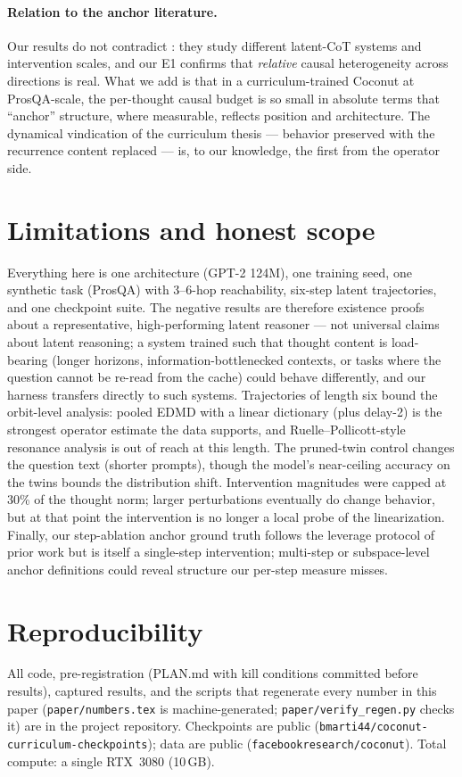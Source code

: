 \documentclass[11pt]{article}
\newcommand{\prosqa}{ProsQA}
\begin{document}
\paragraph{Relation to the anchor literature.} Our results do not contradict
\citet{li2026dynamics}: they study different latent-CoT systems and intervention
scales, and our E1 confirms that \emph{relative} causal heterogeneity across
directions is real. What we add is that in a curriculum-trained Coconut at
ProsQA-scale, the per-thought causal budget is so small in absolute terms that
``anchor'' structure, where measurable, reflects position and architecture. The
dynamical vindication of the curriculum thesis \citep{martin2026curriculum} ---
behavior preserved with the recurrence content replaced --- is, to our knowledge,
the first from the operator side.

\section{Limitations and honest scope}
\label{sec:limits}

Everything here is one architecture (GPT-2 124M), one training seed, one synthetic
task (\prosqa) with 3--6-hop reachability, six-step latent trajectories, and one
checkpoint suite. The negative results are therefore existence proofs about a
representative, high-performing latent reasoner --- not universal claims about
latent reasoning; a system trained such that thought content is load-bearing
(longer horizons, information-bottlenecked contexts, or tasks where the question
cannot be re-read from the cache) could behave differently, and our harness
transfers directly to such systems. Trajectories of length six bound the
orbit-level analysis: pooled EDMD with a linear dictionary (plus delay-2) is the
strongest operator estimate the data supports, and Ruelle--Pollicott-style
resonance analysis is out of reach at this length. The pruned-twin control changes
the question text (shorter prompts), though the model's near-ceiling accuracy on
the twins bounds the distribution shift. Intervention magnitudes were capped at
30\% of the thought norm; larger perturbations eventually do change behavior, but
at that point the intervention is no longer a local probe of the linearization.
Finally, our step-ablation anchor ground truth follows the leverage protocol of
prior work but is itself a single-step intervention; multi-step or subspace-level
anchor definitions could reveal structure our per-step measure misses.

\section{Reproducibility}
All code, pre-registration (PLAN.md with kill conditions committed before results),
captured results, and the scripts that regenerate every number in this paper
(\texttt{paper/numbers.tex} is machine-generated; \texttt{paper/verify\_regen.py}
checks it) are in the project repository. Checkpoints are public
(\texttt{bmarti44/coconut-curriculum-checkpoints}); data are public
(\texttt{facebookresearch/coconut}). Total compute: a single RTX~3080 (10\,GB).



\end{document}

